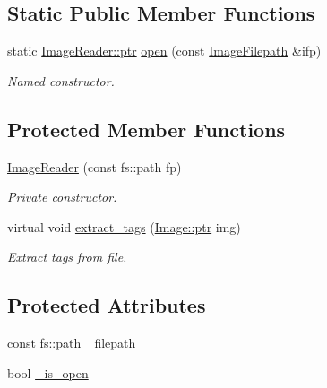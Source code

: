 \subsection*{Static Public Member Functions}
\begin{DoxyCompactItemize}
\item 
static \hyperlink{class_photo_finish_1_1_image_reader_a4f077d55ff971217578dc51db00715aa}{Image\+Reader\+::ptr} \hyperlink{class_photo_finish_1_1_image_reader_a8d27d2cf762f16189fbdd41182a1dc9e}{open} (const \hyperlink{class_photo_finish_1_1_image_filepath}{Image\+Filepath} \&ifp)
\begin{DoxyCompactList}\small\item\em Named constructor. \end{DoxyCompactList}\end{DoxyCompactItemize}
\subsection*{Protected Member Functions}
\begin{DoxyCompactItemize}
\item 
\hyperlink{class_photo_finish_1_1_image_reader_a9ce29baef024a887afc7a878fa6c71b5}{Image\+Reader} (const fs\+::path fp)
\begin{DoxyCompactList}\small\item\em Private constructor. \end{DoxyCompactList}\item 
virtual void \hyperlink{class_photo_finish_1_1_image_reader_a753ec07db45220b64a28d60200f5c3e2}{extract\+\_\+tags} (\hyperlink{class_photo_finish_1_1_image_ab336203305ed3a1397d7245063353b5a}{Image\+::ptr} img)
\begin{DoxyCompactList}\small\item\em Extract tags from file. \end{DoxyCompactList}\end{DoxyCompactItemize}
\subsection*{Protected Attributes}
\begin{DoxyCompactItemize}
\item 
const fs\+::path \hyperlink{class_photo_finish_1_1_image_reader_a674ef814523d0ff26c92c725888df0fa}{\+\_\+filepath}
\item 
bool \hyperlink{class_photo_finish_1_1_image_reader_a969fccd8f1d2fb28875c62a3f051dbcb}{\+\_\+is\+\_\+open}
\end{DoxyCompactItemize}


